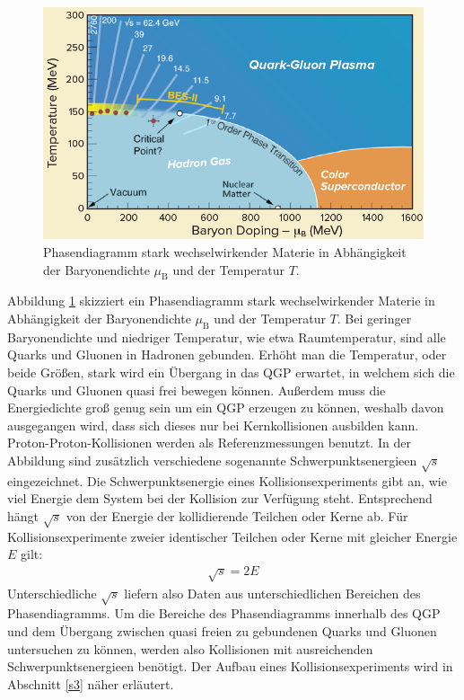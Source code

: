 \begin{figure}[thp]
\centering
\includegraphics[width=.7\linewidth]{QGPPhaseDiagram.png}
\caption{Phasendiagramm stark wechselwirkender Materie in Abh\"angigkeit der Baryonendichte $\mu_{\text{B}}$ und der Temperatur $T$.
\cite{PAPER:1}}
\label{fig:QGPPhase}
\end{figure}
Abbildung \ref{fig:QGPPhase} skizziert ein Phasendiagramm stark wechselwirkender Materie in Abh\"angigkeit der Baryonendichte $\mu_{\text{B}}$ und der Temperatur $T$.
Bei geringer Baryonendichte und niedriger Temperatur, wie etwa Raumtemperatur, sind alle Quarks und Gluonen in Hadronen gebunden.
Erh\"oht man die Temperatur, oder beide Gr\"o{\ss}en, stark wird ein \"Ubergang in das QGP erwartet, in welchem sich die Quarks und Gluonen quasi frei bewegen k\"onnen.
Au{\ss}erdem muss die Energiedichte gro{\ss} genug sein um ein QGP erzeugen zu k\"onnen, weshalb davon ausgegangen wird, dass sich dieses nur bei Kernkollisionen ausbilden kann.
Proton-Proton-Kollisionen werden als Referenzmessungen benutzt.
\newline
In der Abbildung sind zus\"atzlich verschiedene sogenannte Schwerpunktsenergieen $\sqrt{s}$ eingezeichnet.
Die Schwerpunktsenergie eines Kollisionsexperiments gibt an, wie viel Energie dem System bei der Kollision zur Verf\"ugung steht.
Entsprechend h\"angt $\sqrt{s}$ von der Energie der kollidierende Teilchen oder Kerne ab.
F\"ur Kollisionsexperimente zweier identischer Teilchen oder Kerne mit gleicher Energie $E$ gilt:
\begin{align}
\sqrt{s} = 2E \label{eq:sqrts}
\end{align}
Unterschiedliche $\sqrt{s}$ liefern also Daten aus unterschiedlichen Bereichen des Phasendiagramms.
Um die Bereiche des Phasendiagramms innerhalb des QGP und dem \"Ubergang zwischen quasi freien zu gebundenen Quarks und Gluonen untersuchen zu k\"onnen, werden also Kollisionen mit ausreichenden Schwerpunktsenergieen ben\"otigt.
Der Aufbau eines Kollisionsexperiments wird in Abschnitt \ref{s3} n\"aher erl\"autert.



